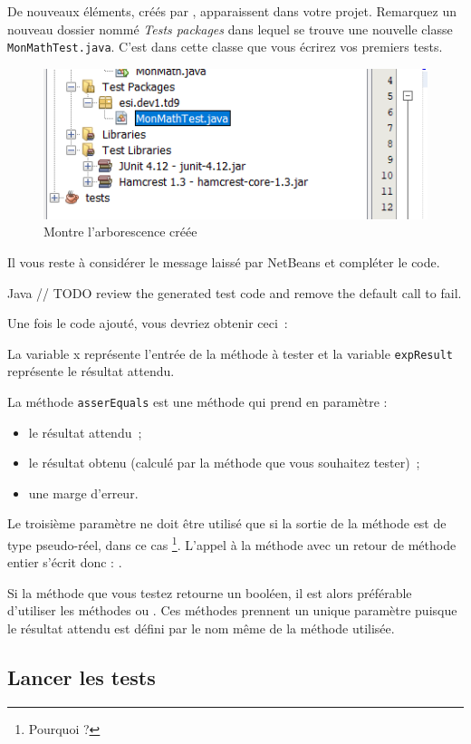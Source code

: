 \documentclass[a4paper,11pt]{style-esi/td}
\begin{document}
De nouveaux éléments, créés par , apparaissent dans votre projet.
Remarquez un nouveau dossier nommé \emph{Tests packages}
dans lequel se trouve une nouvelle classe \texttt{MonMathTest.java}.
C'est dans cette classe que vous écrirez vos premiers tests.

\begin{figure}[hbt!]
	\centering
	\includegraphics[width=.4\textwidth]{images/libraries}
	\caption{Montre l'arborescence créée}
\end{figure}

Il vous reste à considérer le message laissé par NetBeans et compléter le code.
\begin{Code}{Java}
	// TODO review the generated test code and remove the default call to fail.
\end{Code}

Une fois le code ajouté, vous devriez obtenir ceci~:

La variable x représente l’entrée de la méthode à tester
et la variable \texttt{expResult} représente le résultat attendu.

La méthode \texttt{asserEquals} est une méthode qui prend en paramètre :
\begin{itemize}
	\item le résultat attendu~;
	\item le résultat obtenu (calculé par la méthode que vous souhaitez tester)~;
	\item une marge d’erreur.
\end{itemize}

Le troisième paramètre ne doit être utilisé
que si la sortie de la méthode est de type pseudo-réel, dans ce cas %
\footnote{Pourquoi ?}.
L’appel à la méthode  avec un retour de méthode entier
s’écrit donc : .

Si la méthode que vous testez retourne un booléen,
il est alors préférable d’utiliser les méthodes 
ou .
Ces méthodes prennent un unique paramètre puisque le résultat attendu est défini
par le nom même de la méthode utilisée.

\subsection{Lancer les tests}
\end{document}
